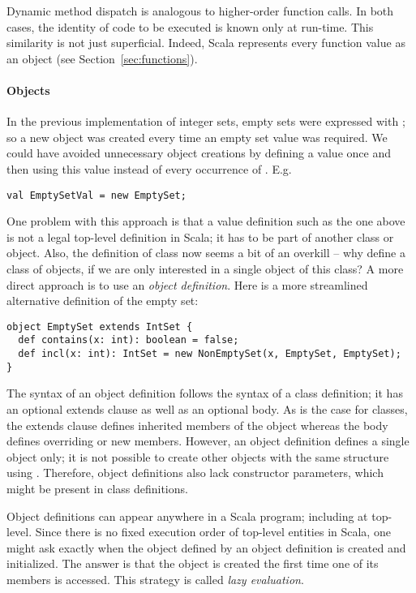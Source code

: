 Dynamic method dispatch is analogous to higher-order function
calls. In both cases, the identity of code to be executed is known
only at run-time. This similarity is not just superficial. Indeed,
Scala represents every function value as an object (see
Section~\ref{sec:functions}).


\paragraph{Objects}

In the previous implementation of integer sets, empty sets were
expressed with ; so a new object was created every time
an empty set value was required. We could have avoided unnecessary
object creations by defining a value  once and then using
this value instead of every occurrence of . E.g.
\begin{lstlisting}
val EmptySetVal = new EmptySet;
\end{lstlisting}
One problem with this approach is that a value definition such as the
one above is not a legal top-level definition in Scala; it has to be
part of another class or object. Also, the definition of class
 now seems a bit of an overkill -- why define a class of objects, 
if we are only interested in a single object of this class? A more
direct approach is to use an {\em object definition}. Here is
a more streamlined alternative definition of the empty set:
\begin{lstlisting}
object EmptySet extends IntSet {
  def contains(x: int): boolean = false;
  def incl(x: int): IntSet = new NonEmptySet(x, EmptySet, EmptySet);
}
\end{lstlisting}
The syntax of an object definition follows the syntax of a class
definition; it has an optional extends clause as well as an optional
body. As is the case for classes, the extends clause defines inherited
members of the object whereas the body defines overriding or new
members.  However, an object definition defines a single object only;
it is not possible to create other objects with the same structure
using .  Therefore, object definitions also lack constructor
parameters, which might be present in class definitions.

Object definitions can appear anywhere in a Scala program; including
at top-level.  Since there is no fixed execution order of top-level
entities in Scala, one might ask exactly when the object defined by an
object definition is created and initialized. The answer is that the
object is created the first time one of its members is accessed. This
strategy is called {\em lazy evaluation}.

